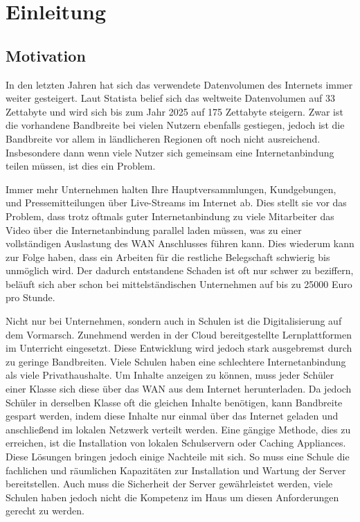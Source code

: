 \chapter{Einleitung}\label{ch:introduction}


%
\section{Motivation}
In den letzten Jahren hat sich das verwendete Datenvolumen des Internets immer weiter gesteigert. Laut Statista belief sich das weltweite Datenvolumen auf 33 Zettabyte und wird sich bis zum Jahr 2025 auf 175 Zettabyte steigern.\cite{statistica-datenvolumen} Zwar ist die vorhandene Bandbreite bei vielen Nutzern ebenfalls gestiegen, jedoch ist die Bandbreite vor allem in ländlicheren Regionen oft noch nicht ausreichend.\cite{bmvi-bandbreite} Insbesondere dann wenn viele Nutzer sich gemeinsam eine Internetanbindung teilen müssen, ist dies ein Problem.

Immer mehr Unternehmen halten Ihre Hauptversammlungen, Kundgebungen, und Pressemitteilungen über Live-Streams im Internet ab. Dies stellt sie vor das Problem, dass trotz oftmals guter Internetanbindung zu viele Mitarbeiter das Video über die Internetanbindung parallel laden müssen, was zu einer vollständigen Auslastung des WAN Anschlusses führen kann. Dies wiederum kann zur Folge haben, dass ein Arbeiten für die restliche Belegschaft schwierig bis unmöglich wird. Der dadurch entstandene Schaden ist oft nur schwer zu beziffern, beläuft sich aber schon bei mittelständischen Unternehmen auf bis zu 25000 Euro pro Stunde.\cite{zero-internet-schaden}

Nicht nur bei Unternehmen, sondern auch in Schulen ist die Digitalisierung auf dem Vormarsch. Zunehmend werden in der Cloud bereitgestellte Lernplattformen im Unterricht eingesetzt. Diese Entwicklung wird jedoch stark ausgebremst durch zu geringe Bandbreiten. Viele Schulen haben eine schlechtere Internetanbindung als viele Privathaushalte.\cite{sonderstudie_digital} Um Inhalte anzeigen zu können, muss jeder Schüler einer Klasse sich diese über das WAN aus dem Internet herunterladen. Da jedoch Schüler in derselben Klasse oft die gleichen Inhalte benötigen, kann Bandbreite gespart werden, indem diese Inhalte nur einmal über das Internet geladen und anschließend im lokalen Netzwerk verteilt werden. Eine gängige Methode, dies zu erreichen, ist die Installation von lokalen Schulservern oder Caching Appliances. Diese Lösungen bringen jedoch einige Nachteile mit sich. So muss eine Schule die fachlichen und räumlichen Kapazitäten zur Installation und Wartung der Server bereitstellen. Auch muss die Sicherheit der Server gewährleistet werden, viele Schulen haben jedoch nicht die Kompetenz im Haus um diesen Anforderungen gerecht zu werden. 

